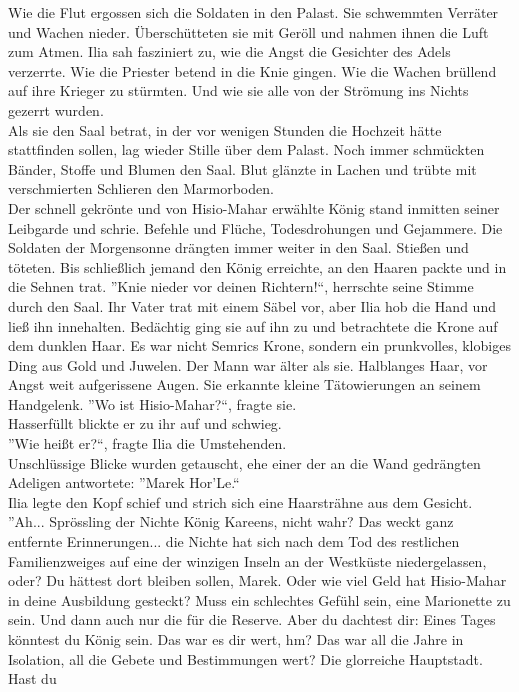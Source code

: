 Wie die Flut ergossen sich die Soldaten in den Palast. Sie schwemmten Verräter und Wachen nieder. 
Überschütteten sie mit Geröll und nahmen ihnen die Luft zum Atmen. Ilia sah fasziniert zu, wie die 
Angst die Gesichter des Adels verzerrte. Wie die Priester betend in die Knie gingen. Wie die Wachen 
brüllend auf ihre Krieger zu stürmten. Und wie sie alle von der Strömung ins Nichts gezerrt 
wurden.\\
Als sie den Saal betrat, in der vor wenigen Stunden die Hochzeit hätte stattfinden sollen, lag wieder 
Stille über dem Palast. Noch immer schmückten Bänder, Stoffe und Blumen den Saal. Blut glänzte in 
Lachen und trübte mit verschmierten Schlieren den Marmorboden.\\
Der schnell gekrönte und von Hisio-Mahar erwählte König stand inmitten seiner Leibgarde und 
schrie. Befehle und Flüche, Todesdrohungen und Gejammere. Die Soldaten der Morgensonne drängten 
immer weiter in den Saal. Stießen und töteten. Bis schließlich jemand den König erreichte, an 
den Haaren packte und in die Sehnen trat. ''Knie nieder vor deinen Richtern!``, herrschte seine 
Stimme durch den Saal. Ihr Vater trat mit einem Säbel vor, aber Ilia hob die Hand und ließ ihn 
innehalten. Bedächtig ging sie auf ihn zu und betrachtete die Krone auf dem dunklen Haar. Es war 
nicht Semrics Krone, sondern ein prunkvolles, klobiges Ding aus Gold und Juwelen. Der Mann 
war älter als sie. Halblanges Haar, vor Angst weit aufgerissene Augen. Sie erkannte kleine 
Tätowierungen an seinem Handgelenk. ''Wo ist Hisio-Mahar?``, fragte sie.\\
Hasserfüllt blickte er zu ihr auf und schwieg.\\
''Wie heißt er?``, fragte Ilia die Umstehenden.\\
Unschlüssige Blicke wurden getauscht, ehe einer der an die Wand gedrängten Adeligen antwortete: 
''Marek Hor'Le.``\\
Ilia legte den Kopf schief und strich sich eine Haarsträhne aus dem Gesicht. ''Ah... Sprössling der 
Nichte König Kareens, nicht wahr? Das weckt ganz entfernte Erinnerungen... die Nichte hat sich nach 
dem Tod des restlichen Familienzweiges auf eine der winzigen Inseln an der Westküste niedergelassen, 
oder? Du hättest dort bleiben sollen, Marek. Oder wie viel Geld hat Hisio-Mahar in deine Ausbildung 
gesteckt? Muss ein schlechtes Gefühl sein, eine Marionette zu sein. Und dann auch nur die für die 
Reserve. Aber du dachtest dir: Eines Tages könntest du König sein. Das war es dir wert, hm? Das war 
all die Jahre in Isolation, all die Gebete und Bestimmungen wert? Die glorreiche Hauptstadt. Hast du 
